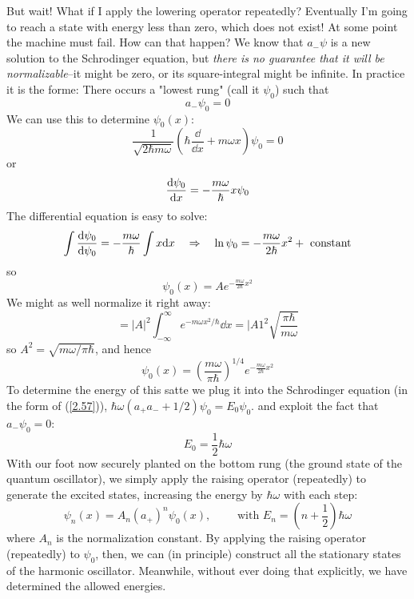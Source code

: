 But wait! What if I apply the lowering operator repeatedly? Eventually I'm going to reach a state with energy less than zero, which does not exist! At some point the machine must fail. How can that happen?  We know that $a_-\psi$ is a new solution to the Schrodinger equation, but \textit{there is no guarantee that it will be normalizable}--it might be zero, or its square-integral might be infinite. In practice it is the forme: There occurs a "lowest rung" (call it $\psi_0$) such that
\begin{equation}\label{2.58}
	a_-\psi_0=0
\end{equation}
We can use this to determine $\psi_0(x)$:
$$\frac{1}{\sqrt{2\hbar m\omega}}\left(\hbar\frac{\dd}{\dd x}+m\omega x\right)\psi_0=0$$ or $$\dv{\psi_0}{x}=-\frac{m\omega}{\hbar}x\psi_0$$
The differential equation is easy to solve:
$$\int\dv{\psi_0}{\psi_0}=-\frac{m\omega}{\hbar}\int x\dd x\quad\Rightarrow\quad \ln\psi_0=-\frac{m\omega}{2\hbar}x^2+\mbox{ constant}$$ so $$\psi_0(x)=Ae^{-\frac{m\omega}{2\hbar}x^2}$$
We might as well normalize it right away: $$=|A|^2\int_{-\infty}^\infty e^{-m\omega x^2/\hbar}\dd x=|A1^2\sqrt{\frac{\pi\hbar}{m\omega}}$$ so $A^2=\sqrt{m\omega/\pi\hbar}$, and hence
\begin{equation}\label{2.59}
	\boxed{\psi_0(x)=\left(\frac{m\omega}{\pi\hbar}\right)^{1/4}e^{-\frac{m\omega}{2\hbar}x^2}}
\end{equation}
To determine the energy of this satte we plug it into the Schrodinger equation (in the form of (\ref{2.57})), $\hbar\omega(a_+a_-+1/2)\psi_0=E_0\psi_0$. and exploit the fact that $a_-\psi_0=0$:
\begin{equation}\label{2.60}
	E_0=\frac{1}{2}\hbar\omega
\end{equation}
With our foot now securely planted on the bottom rung (the ground state of the quantum oscillator), we simply apply the raising operator (repeatedly) to generate the excited states, increasing the energy by $\hbar\omega $ with each step:
\begin{equation}\label{2.61}
	\boxed{\psi_n(x)=A_n(a_+)^n \psi_0(x),\qquad\mbox{ with  }E_n=\left(n+\frac{1}{2}\right)\hbar\omega     }
\end{equation}
where $A_n$ is the normalization constant. By applying the raising operator (repeatedly) to $\psi_0$, then, we can (in principle) construct all the stationary states of the harmonic oscillator. Meanwhile, without ever doing that explicitly, we have determined the allowed energies.

